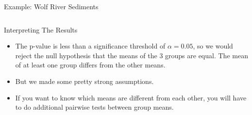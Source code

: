 \documentclass[
  ignorenonframetext,
]{beamer}
\providecommand{\tightlist}{%
  \setlength{\itemsep}{0pt}\setlength{\parskip}{0pt}}\usepackage{longtable,booktabs,array}
\begin{document}
\begin{frame}{Example: Wolf River Sediments}
\begin{columns}[T]
\begin{frame}{Interpreting The Results}
\pause

\begin{itemize}
\tightlist
\item
  The p-value is less than a significance threshold of \(\alpha=0.05\),
  so we would reject the null hypothesis that the means of the 3 groups
  are equal. The mean of at least one group differs from the other
  means.
\end{itemize}

\pause

\begin{itemize}
\tightlist
\item
  But we made some pretty strong assumptions.
\end{itemize}

\pause

\begin{itemize}
\tightlist
\item
  If you want to know which means are different from each other, you
  will have to do additional pairwise tests between group means.
\end{itemize}
\end{frame}
\end{columns}
\end{frame}
\end{document}
